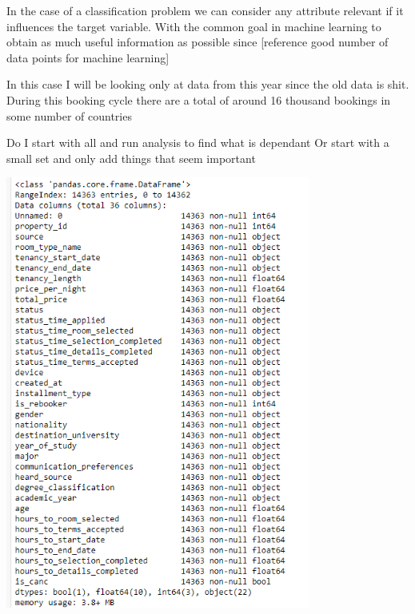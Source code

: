 In the case of a classification problem we can consider any attribute relevant if it influences the target variable. With the common goal in machine learning to obtain as much useful information as possible since [reference good number of data points for machine learning]

In this case I will be looking only at data from this year since the old data is shit. During this booking cycle there are a total of around 16 thousand bookings  in some number of countries 

Do I start with all and run analysis to find what is dependant 
Or start with a small set and only add things that seem important

\includegraphics[width=10cm]{figures/df_info.png}


